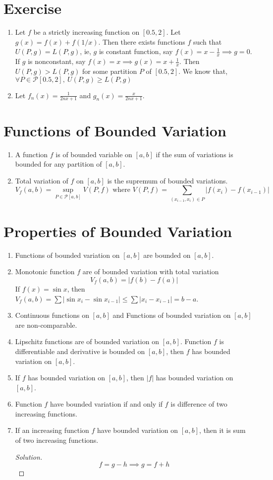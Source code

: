 \section*{Exercise}
\begin{enumerate}
	\item Let $f$ be a strictly increasing function on $[0.5,2]$. Let $g(x) = f(x) +f(1/x)$. Then there exists functions $f$ such that $U(P,g) = L(P,g)$, ie, $g$ is constant function,  say $f(x) = x-\frac{1}{x} \implies g = 0$. If $g$ is nonconstant, say $f(x) = x \implies g(x) = x + \frac{1}{x}$. Then $U(P,g) > L(P,g)$ for some partition $P$ of $[0.5,2]$. We know that, $\forall P \in \mathscr{P}[0.5,2],\ U(P,g) \ge L(P,g)$
	\item Let $f_n(x) = \frac{1}{2nx+1}$ and $g_n(x) = \frac{x}{2nx+1}$.
\end{enumerate}

\section{Functions of Bounded Variation}
\begin{enumerate}
	\item A function $f$ is of bounded variable on $[a,b]$ if the sum of variations is bounded for any partition of $[a,b]$.
	\item Total variation of $f$ on $[a,b]$ is the supremum of bounded variations.
		$$ V_f(a,b) = \sup_{P \in \mathscr{P}[a,b]} \!\!\! V(P,f) \text{ where } V(P,f) = \!\!\!\!\!\! \sum_{(x_{i-1},x_i) \in P}\!\!\!\!\!\! |f(x_i) - f(x_{i-1})| $$
\end{enumerate}

\section{Properties of Bounded Variation}
\begin{enumerate}
	\item Functions of bounded variation on $[a,b]$ are bounded on $[a,b]$.
	\item Monotonic function $f$ are of bounded variation with total variation 
		$$ V_f(a,b) = |f(b)-f(a)| $$
		\subitem If $f(x) = \sin x$, then $V_f(a,b) = \sum |\sin x_i - \sin x_{i-1}| \le \sum |x_i - x_{i-1}| = b-a$.
	\item Continuous functions on $[a,b]$ and Functions of bounded variation on $[a,b]$ are non-comparable.
	\item Lipschitz functions are of bounded variation on $[a,b]$.
		\subitem Function $f$ is differentiable and derivative is bounded on $[a,b]$, then $f$ has bounded variation on $[a,b]$.
	\item If $f$ has bounded variation on $[a,b]$, then $|f|$ has bounded variation on $[a,b]$.
	\item Function $f$ have bounded variation if and only if $f$ is difference of two increasing functions.
	\item If an increasing function $f$ have bounded variation on $[a,b]$, then it is sum of two increasing functions.
	\begin{proof}[Solution]
		$$ f = g-h \implies g = f+h $$
	\end{proof}
\end{enumerate}

